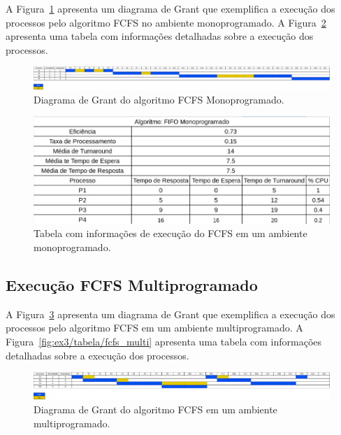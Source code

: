 \documentclass[
	12pt,				%
	oneside,   	        %
	a4paper,			%
	english,			%
	french,				%
	spanish,			%
	brazil,				%
	]{pacotes/abntex2}
\begin{document}
A Figura~\ref{fig:ex3/diagrama/fcfs_mono} apresenta um diagrama de Grant que exemplifica a execução dos processos pelo algoritmo FCFS no ambiente monoprogramado. A Figura~\ref{fig:ex3/tabela/fcfs_mono} apresenta uma tabela com informações detalhadas sobre a execução dos processos.

\begin{figure}[H]
  \centering
  \includegraphics[scale=0.20]{figuras/ex3/diagrama/fcfs_mono.png}
  \caption{Diagrama de Grant do algoritmo FCFS Monoprogramado.}
  \label{fig:ex3/diagrama/fcfs_mono}
\end{figure}

\begin{figure}[H]
  \centering
  \includegraphics[scale=0.5]{figuras/ex3/tabela/fifo_mono.png}
  \caption{Tabela com informações de execução do FCFS em um ambiente monoprogramado.}
  \label{fig:ex3/tabela/fcfs_mono}
\end{figure}

\subsection{Execução FCFS Multiprogramado}
\label{subsubsec:fcfs_multi}

A Figura~\ref{fig:ex3/diagrama/fcfs_multi} apresenta um diagrama de Grant que exemplifica a execução dos processos pelo algoritmo FCFS em um ambiente multiprogramado. A Figura~\ref{fig:ex3/tabela/fcfs_multi} apresenta uma tabela com informações detalhadas sobre a execução dos processos.

\begin{figure}[H]
  \centering
  \includegraphics[scale=0.20]{figuras/ex3/diagrama/fcfs_multi.png}
  \caption{Diagrama de Grant do algoritmo FCFS em um ambiente multiprogramado.}
  \label{fig:ex3/diagrama/fcfs_multi}
\end{figure}
\end{document}
